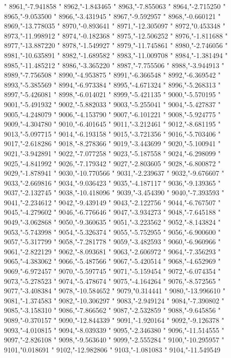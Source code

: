 "
8961,"-7.941858
"
8962,"-1.843465
"
8963,"-7.855063
"
8964,"-2.715250
"
8965,"-9.053500
"
8966,"-3.431945
"
8967,"-9.592957
"
8968,"-0.660121
"
8969,"-13.778035
"
8970,"-0.893641
"
8971,"-12.305097
"
8972,"0.453348
"
8973,"-11.998912
"
8974,"-0.182368
"
8975,"-12.506252
"
8976,"-1.811688
"
8977,"-13.887220
"
8978,"-1.549927
"
8979,"-11.745861
"
8980,"-2.746056
"
8981,"-10.635891
"
8982,"-1.689582
"
8983,"-11.009708
"
8984,"-1.381494
"
8985,"-11.485212
"
8986,"-3.365220
"
8987,"-7.755506
"
8988,"-3.944913
"
8989,"-7.756508
"
8990,"-4.953875
"
8991,"-6.366548
"
8992,"-6.369542
"
8993,"-5.385569
"
8994,"-6.973384
"
8995,"-4.671324
"
8996,"-5.268313
"
8997,"-5.426081
"
8998,"-6.014021
"
8999,"-5.421135
"
9000,"-5.570195
"
9001,"-5.491932
"
9002,"-5.882033
"
9003,"-5.255041
"
9004,"-5.427837
"
9005,"-4.248079
"
9006,"-4.153790
"
9007,"-6.101221
"
9008,"-5.924775
"
9009,"-4.304780
"
9010,"-6.401645
"
9011,"-3.212461
"
9012,"-8.681195
"
9013,"-5.097715
"
9014,"-6.193158
"
9015,"-3.721356
"
9016,"-5.703406
"
9017,"-2.618286
"
9018,"-8.278366
"
9019,"-3.443699
"
9020,"-5.100941
"
9021,"-3.942891
"
9022,"-7.077258
"
9023,"-5.187558
"
9024,"-6.298099
"
9025,"-4.841992
"
9026,"-7.179342
"
9027,"-2.803605
"
9028,"-6.800872
"
9029,"-1.878941
"
9030,"-10.770566
"
9031,"-2.239637
"
9032,"-9.676607
"
9033,"-2.669816
"
9034,"-9.036423
"
9035,"-4.187117
"
9036,"-9.139365
"
9037,"-2.132745
"
9038,"-10.418096
"
9039,"-3.454390
"
9040,"-7.393593
"
9041,"-2.234612
"
9042,"-9.439149
"
9043,"-2.122756
"
9044,"-6.767507
"
9045,"-4.279602
"
9046,"-6.776646
"
9047,"-3.934273
"
9048,"-7.645188
"
9049,"-3.062868
"
9050,"-9.360635
"
9051,"-3.223562
"
9052,"-8.143824
"
9053,"-5.743998
"
9054,"-5.326374
"
9055,"-5.752955
"
9056,"-6.900600
"
9057,"-5.317799
"
9058,"-7.281778
"
9059,"-3.482593
"
9060,"-6.960966
"
9061,"-2.822129
"
9062,"-8.093681
"
9063,"-2.606972
"
9064,"-7.356293
"
9065,"-4.383062
"
9066,"-5.487566
"
9067,"-5.420514
"
9068,"-4.652969
"
9069,"-6.972457
"
9070,"-5.597745
"
9071,"-5.159454
"
9072,"-6.074354
"
9073,"-5.278523
"
9074,"-5.478674
"
9075,"-4.164264
"
9076,"-8.572565
"
9077,"-3.408384
"
9078,"-10.584652
"
9079,"0.314441
"
9080,"-13.996610
"
9081,"-1.374583
"
9082,"-10.306297
"
9083,"-2.949124
"
9084,"-7.390802
"
9085,"-3.158310
"
9086,"-7.866562
"
9087,"-2.532859
"
9088,"-9.645856
"
9089,"-0.370157
"
9090,"-12.844339
"
9091,"-1.920164
"
9092,"-9.126378
"
9093,"-4.010815
"
9094,"-8.039339
"
9095,"-2.346380
"
9096,"-11.514555
"
9097,"-2.826108
"
9098,"-9.563640
"
9099,"-2.555284
"
9100,"-10.295957
"
9101,"0.018691
"
9102,"-12.982806
"
9103,"-1.081083
"
9104,"-11.549549
